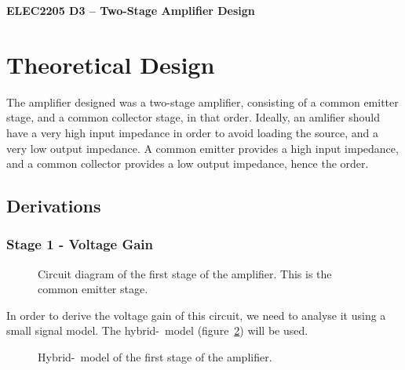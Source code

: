 \documentclass[a4paper,11pt]{article}
\begin{document}
  
\begin{center}
{\Large{\textbf{ELEC2205 D3 -- Two-Stage Amplifier Design}}} \\ [\baselineskip]

\end{center}

\begin{abstract}
    A two stage analogue amplifier was designed and built. It consisted of a common emitter stage followed by a common collector stage. An overall gain of 5.66 was achieved, with an input impedance of \SI{44.6}{\kilo\ohm}, and an output impedance of \SI{12.8}{\ohm}. The gain was within specification, input impedance exceeded it, output impedance did not meet the specification.
\end{abstract}

\tableofcontents
\newpage

\section{Theoretical Design}
    The amplifier designed was a two-stage amplifier, consisting of a common emitter stage, and a common collector stage, in that order. Ideally, an amlifier should have a very high input impedance in order to avoid loading the source, and a very low output impedance. A common emitter provides a high input impedance, and a common collector provides a low output impedance, hence the order.
    
    \subsection{Derivations}
        \subsubsection{Stage 1 - Voltage Gain}

            \begin{figure}[h]
            \centering
                
                \caption{Circuit diagram of the first stage of the amplifier. This is the common emitter stage.}
                \label{fig:stage1}
            \end{figure}

            In order to derive the voltage gain of this circuit, we need to analyse it using a small signal model. The hybrid-\textpi\ model (figure~\ref{fig:stage1hpi}) will be used.

            \begin{figure}[h]
            \centering
                
                \caption{Hybrid-\textpi\ model of the first stage of the amplifier.}
                \label{fig:stage1hpi}
            \end{figure}
\end{document}
